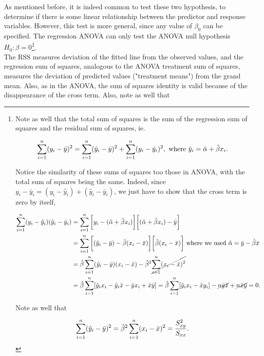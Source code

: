 \documentclass{homework}
\begin{document}
As mentioned before, it is indeed common to test these two hypothesis, to determine if there is some linear relationship between the predictor and response variables. However, this test is more general, since any value of $\beta_0$ can be specified. The regression ANOVA can only test the ANOVA null hypothesis $H_0: \beta = 0$\footnote{Note as well that the total sum of squares is the sum of the regression sum of squares and the residual sum of squares, ie. 

$$
\sum_{i=1}^{n} (y_i - \bar{y})^2 = \sum_{i=1}^{n} (\hat{y}_i - \bar{y})^2 +  \sum_{i=1}^{n} (y_i - \hat{y}_i)^2, \textnormal{ where } \hat{y}_i = \hat \alpha + \hat \beta x_i. 
$$

Notice the similarity of these sums of squares too those in ANOVA, with the total sum of squares being the same. Indeed, since $y_i - \bar{y}_i = (y_i - \hat y_i) + (\hat y_i - \bar y_i)$, we just have to show that the cross term is zero by itself, 

\begin{align*}
    \sum_{i=1}^{n} (y_i - \hat y_i) (\hat y_i - \bar y_i) &= \sum_{i=1}^{n} \bigg[y_i - (\hat \alpha + \hat \beta x_i)\bigg]\bigg[(\hat \alpha + \hat \beta x_i) - \bar{y}\bigg] \\
    &= \sum_{i=1}^{n} \bigg[(\hat{y}_i - \bar{y}) - \hat{\beta} (x_i - \bar{x})\bigg]\bigg[\hat{\beta}(x_i - \bar{x})\bigg] \textnormal{ where we used } \hat{\alpha} = \bar{y} - \hat{\beta} \bar{x} \\
    &= \hat{\beta} \sum_{i=1}^{n} (\hat{y}_i - \bar{y})(x_i - \bar{x}) - \hat{\beta}^2 \cancel{\sum_{i=1}^{n} (x_i - \bar{x})^2} \\
    &= \hat{\beta} \sum_{i=1}^{n}[\hat{y}_i x_i - \hat{y}_i\bar{x} - \bar{y} x_i + \bar{x}\bar{y}] = \hat{\beta} \sum_{i=1}^{n} [\hat{y}_i x_i - \bar{x}y_i] -\cancel{n\bar{y}\bar{x}} + \cancel{n \bar{x}\bar{y}} = 0.
\end{align*}

Note as well that 

$$
\sum_{i=1}^{n} (\hat{y}_i - \bar{y})^2 = \hat{\beta}^2 \sum_{i=1}^{n} (x_i - \bar{x})^2 = \frac{S_{xy}^2}{S_{xx}}.
$$}. \\

The RSS measures deviation of the fitted line from the observed values, and the regression sum of squares, analogous to the ANOVA treatment sum of squares, measures the deviation of predicted values ("treatment means") from the grand mean. Also, as in the ANOVA, the sum of squares identity is valid because of the disappearance of the cross term. Also, note as well that 
\end{document}
